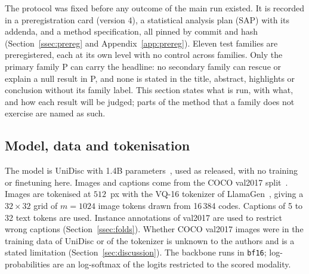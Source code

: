 
The protocol was fixed before any outcome of the main run existed.
It is recorded in a preregistration card (version 4), a statistical analysis plan (SAP) with its addenda, and a method
specification, all pinned by commit and hash (Section~\ref{ssec:prereg} and Appendix~\ref{app:prereg}).
Eleven test families are preregistered, each at its own level with no control across families.
Only the primary family P can carry the headline: no secondary family can rescue or explain a null result in P, and none is stated in
the title, abstract, highlights or conclusion without its family label.
This section states what is run, with what, and how each result will be judged; parts of the method that a family does not
exercise are named as such.

\subsection{Model, data and tokenisation}\label{ssec:data}
The model is UniDisc with 1.4B parameters~\citep{swerdlow2025unidisc}, used as released, with no training or finetuning here.
Images and captions come from the COCO val2017 split~\citep{lin2014coco}.
Images are tokenised at $512$~px with the VQ-16 tokenizer of LlamaGen~\citep{sun2024llamagen}, giving a $32\times32$ grid of
$m=1024$ image tokens drawn from 16\,384 codes.
Captions of 5 to 32 text tokens are used.
Instance annotations of val2017 are used to restrict wrong captions (Section~\ref{ssec:folds}).
Whether COCO val2017 images were in the training data of UniDisc or of the tokenizer is unknown to the authors and is a stated
limitation (Section~\ref{sec:discussion}).
The backbone runs in \texttt{bf16}; log-probabilities are an \fp{} log-softmax of the logits restricted to the scored modality.


